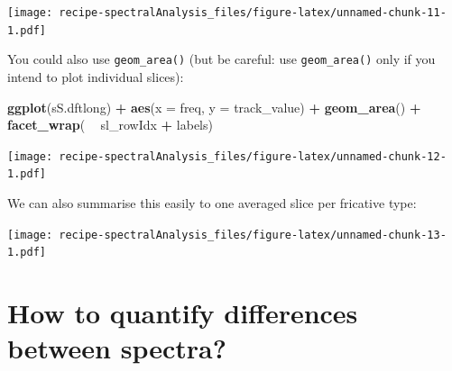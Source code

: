 \documentclass[]{book}
\newenvironment{Shaded}{\begin{snugshade}}{\end{snugshade}}
\newcommand{\DataTypeTok}[1]{\textcolor[rgb]{0.13,0.29,0.53}{#1}}
\newcommand{\KeywordTok}[1]{\textcolor[rgb]{0.13,0.29,0.53}{\textbf{#1}}}
\newcommand{\NormalTok}[1]{#1}
\newcommand{\OperatorTok}[1]{\textcolor[rgb]{0.81,0.36,0.00}{\textbf{#1}}}
\newcommand{\StringTok}[1]{\textcolor[rgb]{0.31,0.60,0.02}{#1}}
\begin{document}
\texttt{[image: recipe-spectralAnalysis\_files/figure-latex/unnamed-chunk-11-1.pdf]}

You could also use \texttt{geom\_area()} (but be careful: use \texttt{geom\_area()} only if you intend to plot individual slices):

\begin{Shaded}
\begin{Highlighting}[]
\KeywordTok{ggplot}\NormalTok{(sS.dftlong) }\OperatorTok{+}
\StringTok{  }\KeywordTok{aes}\NormalTok{(}\DataTypeTok{x =}\NormalTok{ freq, }\DataTypeTok{y =}\NormalTok{ track_value) }\OperatorTok{+}
\StringTok{  }\KeywordTok{geom_area}\NormalTok{() }\OperatorTok{+}
\StringTok{  }\KeywordTok{facet_wrap}\NormalTok{( }\OperatorTok{~}\StringTok{ }\NormalTok{sl_rowIdx }\OperatorTok{+}\StringTok{ }\NormalTok{labels)}
\end{Highlighting}
\end{Shaded}

\texttt{[image: recipe-spectralAnalysis\_files/figure-latex/unnamed-chunk-12-1.pdf]}

We can also summarise this easily to one averaged slice per fricative type:

\begin{Shaded}
\end{Shaded}

\texttt{[image: recipe-spectralAnalysis\_files/figure-latex/unnamed-chunk-13-1.pdf]}

\hypertarget{how-to-quantify-differences-between-spectra}{%
\section{How to quantify differences between spectra?}\label{how-to-quantify-differences-between-spectra}}
\end{document}
